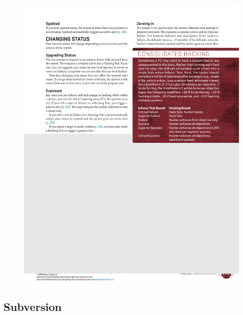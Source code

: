 \begin{figure}[htb!]%
   \centering
   \includegraphics[scale=1.0]{gfx/mesh-consolidated-hacking}%
\end{figure}%

\bigskip

\subsection*{Subversion}

